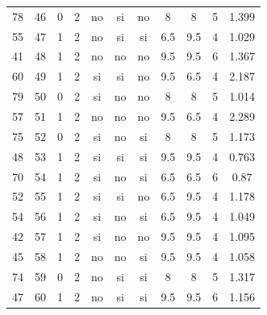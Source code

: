\documentclass[12pt,a4paper,twoside,openright,titlepage,final]{article}
\begin{document}
\begin{appendices}
\begin{landscape}
\begin{center}
\begin{longtable}{@{\extracolsep{\fill}}*{11}{c}}
							78       & 46           & 0         & 2       & no   & si        & no           & 8          & 8             & 5             & 1.399  \\
							55       & 47           & 1         & 2       & no   & si        & si           & 6.5        & 9.5           & 4             & 1.029  \\
							41       & 48           & 1         & 2       & no   & no        & no           & 9.5        & 9.5           & 6             & 1.367  \\
							60       & 49           & 1         & 2       & si   & si        & no           & 9.5        & 6.5           & 4             & 2.187  \\
							79       & 50           & 0         & 2       & si   & no        & no           & 8          & 8             & 5             & 1.014  \\
							57       & 51           & 1         & 2       & no   & no        & no           & 9.5        & 6.5           & 4             & 2.289  \\
							75       & 52           & 0         & 2       & si   & no        & si           & 8          & 8             & 5             & 1.173  \\
							48       & 53           & 1         & 2       & si   & si        & si           & 9.5        & 9.5           & 4             & 0.763  \\
							70       & 54           & 1         & 2       & si   & no        & si           & 6.5        & 6.5           & 6             & 0.87   \\
							52       & 55           & 1         & 2       & si   & si        & no           & 6.5        & 9.5           & 4             & 1.178  \\
							54       & 56           & 1         & 2       & si   & no        & si           & 6.5        & 9.5           & 4             & 1.049  \\
							42       & 57           & 1         & 2       & si   & no        & no           & 9.5        & 9.5           & 4             & 1.095  \\
							45       & 58           & 1         & 2       & no   & no        & si           & 9.5        & 9.5           & 4             & 1.058  \\
							74       & 59           & 0         & 2       & no   & si        & si           & 8          & 8             & 5             & 1.317  \\
							47       & 60           & 1         & 2       & no   & si        & si           & 9.5        & 9.5           & 6             & 1.156  \\

\end{longtable}
\end{center}
\end{landscape}
\end{appendices}
\end{document}

